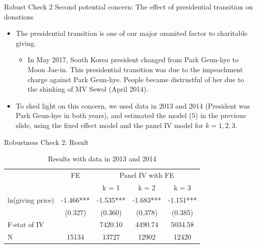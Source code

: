 \documentclass[
  ignorenonframetext,
]{beamer}
\providecommand{\tightlist}{%
  \setlength{\itemsep}{0pt}\setlength{\parskip}{0pt}}
\begin{document}
\begin{frame}{Robust Check 2}
\protect\hypertarget{robust-check-2}{}
Second potential concern: The effect of presidential transition on
donations

\begin{itemize}
\tightlist
\item
  The presidential transition is one of our major ommited factor to
  charitable giving.

  \begin{itemize}
  \tightlist
  \item
    In May 2017, South Korea president changed from Park Geun-hye to
    Moon Jae-in. This presidential transition was due to the impeachment
    charge against Park Geun-hye. People became distrustful of her due
    to the shinking of MV Sewol (April 2014).
  \end{itemize}
\item
  To shed light on this concern, we used data in 2013 and 2014
  (President was Park Geun-hye in both years), and estimated the model
  (5) in the previous slide, using the fixed effect model and the panel
  IV model for \(k = 1, 2, 3\).
\end{itemize}
\end{frame}

\begin{frame}{Robustness Check 2: Result}
\protect\hypertarget{robustness-check-2-result}{}
\begin{table}

\caption{\label{tab:kableShortEstimateElasticity}Results with data in 2013 and 2014}
\centering
\fontsize{9}{11}\selectfont
\begin{tabular}[t]{lcccc}
\toprule
\multicolumn{1}{c}{ } & \multicolumn{1}{c}{FE} & \multicolumn{3}{c}{Panel IV with FE} \\
\cmidrule(l{3pt}r{3pt}){2-2} \cmidrule(l{3pt}r{3pt}){3-5}
 &  & k = 1 & k = 2 & k = 3\\
\midrule
ln(giving price) & -1.466*** & -1.535*** & -1.683*** & -1.151***\\
 & (0.327) & (0.360) & (0.378) & (0.385)\\
F-stat of IV &  & 7420.10 & 4490.74 & 5034.58\\
N & 15134 & 13727 & 12902 & 12420\\
\bottomrule
\end{tabular}
\end{table}
\end{frame}
\end{document}
